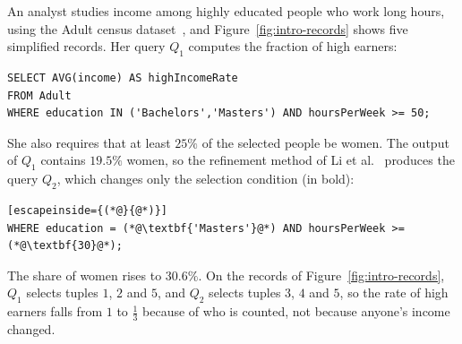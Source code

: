 \begin{example}
\label{ex:intro}
An analyst studies income among highly educated people who work long hours, using the Adult census dataset~\cite{adult-uci}, and Figure~\ref{fig:intro-records} shows five simplified records.
%
Her query $Q_1$ computes the fraction of high earners:

\begin{lstlisting}
SELECT AVG(income) AS highIncomeRate
FROM Adult
WHERE education IN ('Bachelors','Masters') AND hoursPerWeek >= 50;
\end{lstlisting}

\noindent She also requires that at least $25\%$ of the selected people be women.
The output of $Q_1$ contains $19.5\%$ women, so the refinement method of Li et al.~\cite{LMSJ23} produces the query $Q_2$, which changes only the selection condition (in bold):

\begin{lstlisting}[escapeinside={(*@}{@*)}]
WHERE education = (*@\textbf{'Masters'}@*) AND hoursPerWeek >= (*@\textbf{30}@*);
\end{lstlisting}

\noindent The share of women rises to $30.6\%$.
On the records of Figure~\ref{fig:intro-records}, $Q_1$ selects tuples $1$, $2$ and $5$, and $Q_2$ selects tuples $3$, $4$ and $5$, so the rate of high earners falls from $1$ to $\frac{1}{3}$ because of who is counted, not because anyone's income changed.


\end{example}
